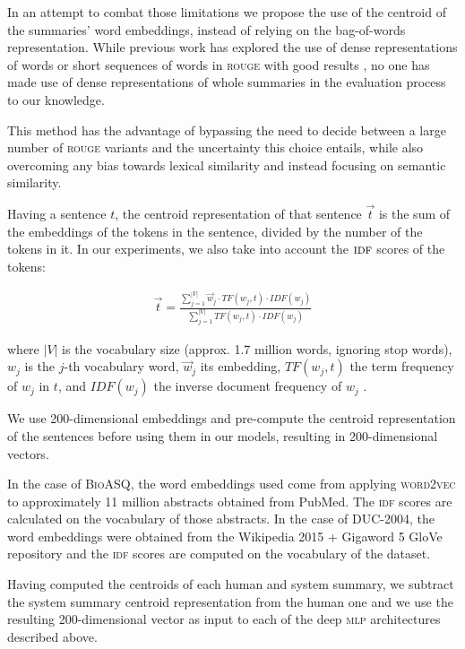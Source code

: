 \documentclass[11pt,a4paper]{article}
\newcommand{\rouge}{\textsc{rouge}\xspace}
\newcommand{\mlp}{\textsc{mlp}\xspace}
\newcommand{\idf}{\textsc{idf}\xspace}
\newcommand{\wordvec}{\textsc{word2vec}\xspace}
\newcommand{\bioasq}{\textsc{BioASQ}\xspace}
\newcommand{\duc}{\textsc{DUC-2004}\xspace}
\begin{document}
In an attempt to combat those limitations we propose the use of the centroid of 
the summaries' word embeddings, instead of relying on the bag-of-words representation. 
While previous work has explored the use of dense representations of words or short 
sequences of words in \rouge with good results \cite{Ng:2015}, no one has made use of
dense representations of whole summaries in the evaluation process to our knowledge.

This method has the advantage of bypassing the need to decide between a large number 
of \rouge variants and the uncertainty this choice entails, while also overcoming any 
bias towards lexical similarity and instead focusing on semantic similarity.

Having a sentence $t$, the centroid representation of that sentence $\vec{t}$ is the 
sum of the embeddings of the tokens in the sentence, divided by the number of the 
tokens in it. In our experiments, we also take into account the $\idf$ scores of 
the tokens:

\begin{align}
\vec{t} = \frac{\sum_{j=1}^{|V|}\vec{w}_j \cdot TF(w_j, t) \cdot IDF(w_j)}{\sum_{j=1}^{|V|} TF(w_j, t) \cdot IDF(w_j)}
\end{align}

where $|V|$ is the vocabulary size (approx. 1.7 million words, ignoring stop words), 
$w_j$ is the $j$-th vocabulary word, $\vec{w}_j$ its embedding, $TF(w_j, t)$ the term 
frequency of $w_j$ in $t$, and $IDF(w_j)$ the inverse document frequency of $w_j$ 
\cite{Manning:2008}.

We use 200-dimensional embeddings and pre-compute the centroid representation of the 
sentences before using them in our models, resulting in 200-dimensional vectors.

In the case of \bioasq, the word embeddings used come from applying \wordvec to 
approximately 11 million abstracts obtained from PubMed. The \idf scores are calculated 
on the vocabulary of those abstracts. In the case of \duc, the word embeddings were 
obtained from the Wikipedia 2015 + Gigaword 5 GloVe repository and the \idf scores 
are computed on the vocabulary of the dataset.

Having computed the centroids of each human and system summary, we subtract the system 
summary centroid representation from the human one and we use the resulting 200-dimensional 
vector as input to each of the deep \mlp architectures described above.
\end{document}
